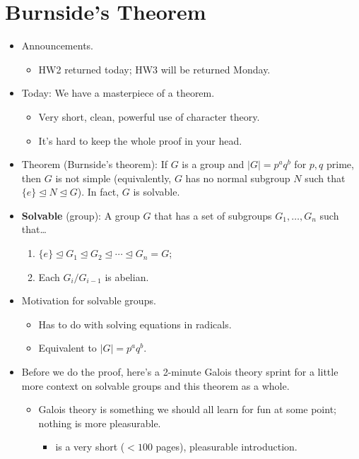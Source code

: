 \documentclass[../notes.tex]{subfiles}
\begin{document}
\section{Burnside's Theorem}
\begin{itemize}
    \item {}Announcements.
    \begin{itemize}
        \item HW2 returned today; HW3 will be returned Monday.
    \end{itemize}
    \item Today: We have a masterpiece of a theorem.
    \begin{itemize}
        \item Very short, clean, powerful use of character theory.
        \item It's hard to keep the whole proof in your head.
    \end{itemize}
    \item Theorem (Burnside's theorem): If $G$ is a group and $|G|=p^aq^b$ for $p,q$ prime, then $G$ is not simple (equivalently, $G$ has no normal subgroup $N$ such that $\{e\}\trianglelefteq N\trianglelefteq G$). In fact, $G$ is solvable.
    \item \textbf{Solvable} (group): A group $G$ that has a set of subgroups $G_1,\dots,G_n$ such that\dots
    \begin{enumerate}
        \item $\{e\}\trianglelefteq G_1\trianglelefteq G_2\trianglelefteq\cdots\trianglelefteq G_n=G$;
        \item Each $G_i/G_{i-1}$ is abelian.
    \end{enumerate}
    \item Motivation for solvable groups.
    \begin{itemize}
        \item Has to do with solving equations in radicals.
        \item Equivalent to $|G|=p^aq^b$.
    \end{itemize}
    \item Before we do the proof, here's a 2-minute Galois theory sprint for a little more context on solvable groups and this theorem as a whole.
    \begin{itemize}
        \item Galois theory is something we should all learn for fun at some point; nothing is more pleasurable.
        \begin{itemize}
            \item \textcite{bib:Artin} is a very short ($<100$ pages), pleasurable introduction.

\end{itemize}
\end{itemize}
\end{itemize}
\end{document}
